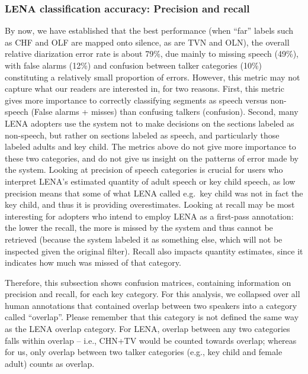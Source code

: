 \documentclass[english,floatsintext,man]{apa6}
\begin{document}
\subsubsection{LENA classification accuracy: Precision and
recall}\label{lena-classification-accuracy-precision-and-recall}

By now, we have established that the best performance (when
\enquote{far} labels such as CHF and OLF are mapped onto silence, as are
TVN and OLN), the overall relative diarization error rate is about 79\%,
due mainly to missing speech (49\%), with false alarms (12\%) and
confusion between talker categories (10\%) constituting a relatively
small proportion of errors. However, this metric may not capture what
our readers are interested in, for two reasons. First, this metric gives
more importance to correctly classifying segments as speech versus
non-speech (False alarms + misses) than confusing talkers (confusion).
Second, many LENA adopters use the system not to make decisions on the
sections labeled as non-speech, but rather on sections labeled as
speech, and particularly those labeled adults and key child. The metrics
above do not give more importance to these two categories, and do not
give us insight on the patterns of error made by the system. Looking at
precision of speech categories is crucial for users who interpret LENA's
estimated quantity of adult speech or key child speech, as low precision
means that some of what LENA called e.g.~key child was not in fact the
key child, and thus it is providing overestimates. Looking at recall may
be most interesting for adopters who intend to employ LENA as a
first-pass annotation: the lower the recall, the more is missed by the
system and thus cannot be retrieved (because the system labeled it as
something else, which will not be inspected given the original filter).
Recall also impacts quantity estimates, since it indicates how much was
missed of that category.

Therefore, this subsection shows confusion matrices, containing
information on precision and recall, for each key category. For this
analysis, we collapsed over all human annotations that contained overlap
between two speakers into a category called \enquote{overlap}. Please
remember that this category is not defined the same way as the LENA
overlap category. For LENA, overlap between any two categories falls
within overlap -- i.e., CHN+TV would be counted towards overlap; whereas
for us, only overlap between two talker categories (e.g., key child and
female adult) counts as overlap.
\end{document}
